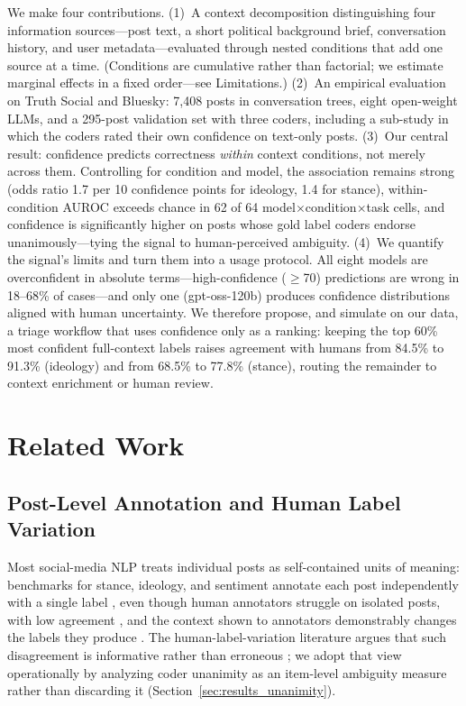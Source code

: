 \documentclass[11pt]{article}
\begin{document}
We make four contributions.
(1)~A context decomposition distinguishing four information sources---post text, a short political background brief, conversation history, and user metadata---evaluated through nested conditions that add one source at a time. (Conditions are cumulative rather than factorial; we estimate marginal effects in a fixed order---see Limitations.)
(2)~An empirical evaluation on Truth Social and Bluesky: 7{,}408 posts in conversation trees, eight open-weight LLMs, and a 295-post validation set with three coders, including a sub-study in which the coders rated their own confidence on text-only posts.
(3)~Our central result: confidence predicts correctness \emph{within} context conditions, not merely across them. Controlling for condition and model, the association remains strong (odds ratio 1.7 per 10 confidence points for ideology, 1.4 for stance), within-condition AUROC exceeds chance in 62 of 64 model$\times$condition$\times$task cells, and confidence is significantly higher on posts whose gold label coders endorse unanimously---tying the signal to human-perceived ambiguity.
(4)~We quantify the signal's limits and turn them into a usage protocol. All eight models are overconfident in absolute terms---high-confidence ($\ge$70) predictions are wrong in 18--68\% of cases---and only one (gpt-oss-120b) produces confidence distributions aligned with human uncertainty. We therefore propose, and simulate on our data, a triage workflow that uses confidence only as a ranking: keeping the top 60\% most confident full-context labels raises agreement with humans from 84.5\% to 91.3\% (ideology) and from 68.5\% to 77.8\% (stance), routing the remainder to context enrichment or human review.

\section{Related Work}

\subsection{Post-Level Annotation and Human Label Variation}

Most social-media NLP treats individual posts as self-contained units of meaning: benchmarks for stance, ideology, and sentiment annotate each post independently with a single label \cite[e.g., for stance,][]{mohammad_semeval-2016_2016, li_p-stance_2021, allaway_zero-shot_2020}, even though human annotators struggle on isolated posts, with low agreement \cite{allaway_zero-shot_2020}, and the context shown to annotators demonstrably changes the labels they produce \cite{joseph_constance_2017}. The human-label-variation literature argues that such disagreement is informative rather than erroneous \cite{aroyo_truth_2015, pavlick_inherent_2019, plank_problem_2022}; we adopt that view operationally by analyzing coder unanimity as an item-level ambiguity measure rather than discarding it (Section~\ref{sec:results_unanimity}).
\end{document}
